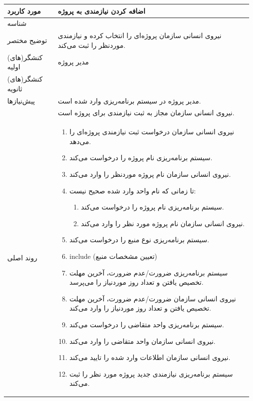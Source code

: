 \newpage
\begin{table}[H]
	\centering
	\begin{tabular}{|p{3cm}|p{10cm}|}
		\hline
		
		
		مورد کاربرد	& اضافه کردن نیازمندی به پروژه  \\
		\hline
		
		شناسه & 
		\stepcounter{usecase_ID}
		
		\arabic{usecase_ID} \\
		
		\hline
		
		توضیح مختصر & نیروی انسانی سازمان پروژه‌ای را انتخاب کرده و نیازمندی موردنظر را ثبت می‌کند. \\
		\hline
		
		کنشگر(های) اولیه& مدیر پروژه \\
		\hline
		
		کنشگر(های) ثانویه&  \\
		\hline
		
		پیش‌نیازها
		& مدیر پروژه در سیستم برنامه‌ریزی وارد شده است.\\
		& نیروی انسانی سازمان مجاز به ثبت نیازمندی برای پروژه است.	\\
		\hline
		
		
		روند اصلی &
		\begin{enumerate}[topsep=0cm,leftmargin=0.5cm]
			\item نیروی انسانی سازمان درخواست ثبت نیازمندی پروژه‌ای را می‌دهد.
			\item سیستم برنامه‌ریزی نام پروژه را درخواست می‌کند.
			\item نیروی انسانی سازمان نام پروژه موردنظر را وارد می‌کند.
			\item تا زمانی که نام واحد وارد شده صحیح نیست: 
			\begin{enumerate}[topsep=0cm,leftmargin=0.5cm]
				\item سیستم برنامه‌ریزی نام پروژه را درخواست می‌کند. 
				\item نیروی انسانی سازمان نام پروژه مورد نظر را وارد می‌کند. 
			\end{enumerate}
			\item سیستم برنامه‌ریزی نوع منبع را درخواست می‌کند.
			\item include (تعیین مشخصات منبع)
			\item سیستم برنامه‌ریزی ضرورت/عدم ضرورت، آخرین مهلت تخصیص یافتن و تعداد روز موردنیاز را می‌پرسد.
			\item نیروی انسانی سازمان ضرورت/عدم ضرورت، آخرین مهلت تخصیص یافتن و تعداد روز موردنیاز را وارد می‌کند.
			\item سیستم برنامه‌ریزی واحد متقاضی را درخواست می‌کند.
			\item نیروی انسانی سازمان واحد متقاضی را وارد می‌کند.
			\item نیروی انسانی سازمان اطلاعات وارد شده را تایید می‌کند.
			\item سیستم برنامه‌ریزی نیازمندی جدید پروژه مورد نظر را ثبت می‌کند.
		\end{enumerate} \\
		

\end{tabular}
\end{table}
